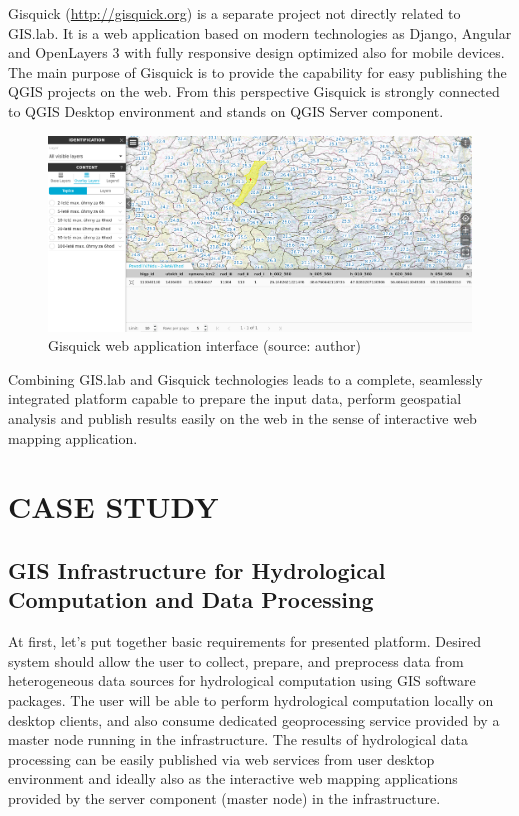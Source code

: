 \documentclass{isprs}
\begin{document}
Gisquick (\url{http://gisquick.org}) is a separate project not
directly related to GIS.lab. It is a web application based on modern
technologies as Django, Angular and OpenLayers 3 with fully responsive
design optimized also for mobile devices. The main purpose of Gisquick
is to provide the capability for easy publishing the QGIS projects on
the web. From this perspective Gisquick is strongly connected to QGIS
Desktop environment and stands on QGIS Server component.

\begin{figure}[ht!]
\begin{center}
  \includegraphics[width=0.9\columnwidth]{figures/gisquick-identify.png}
  \caption{Gisquick web application interface
    (source: author)}
\label{fig:gislab_infrastructure}
\end{center}
\end{figure}

Combining GIS.lab and Gisquick technologies leads to a complete, seamlessly
integrated platform capable to prepare the input data, perform geospatial
analysis and publish results easily on the web in the sense of interactive
web mapping application.

\section{CASE STUDY}

\subsection{GIS Infrastructure for Hydrological Computation and
  Data Processing}\label{GIS Infrastructure for Hydrological Computation and
  Data Processing}

At first, let's put together basic requirements for presented
platform. Desired system should allow the user to collect, prepare,
and preprocess data from heterogeneous data sources for hydrological
computation using GIS software packages. The user will be able to
perform hydrological computation locally on desktop clients, and also
consume dedicated geoprocessing service provided by a master node
running in the infrastructure. The results of hydrological data
processing can be easily published via web services from user desktop
environment and ideally also as the interactive web mapping
applications provided by the server component (master node) in the
infrastructure.
\end{document}
